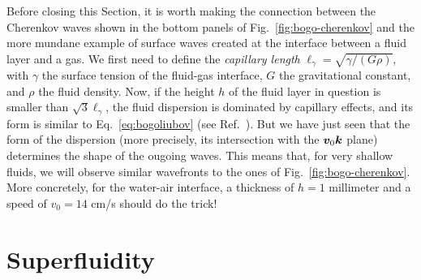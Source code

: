 Before closing this Section, it is worth making the connection between
the Cherenkov waves shown in the bottom panels of
Fig.~\ref{fig:bogo-cherenkov} and the more mundane example of surface
waves created at the interface between a fluid layer and a gas. We
first need to define the \textit{capillary length}
$\ell_{\gamma} = \sqrt{\gamma/(G\rho)}$, with $\gamma$ the surface
tension of the fluid-gas interface, $G$ the gravitational constant,
and $\rho$ the fluid density. Now, if the height $h$ of the fluid
layer in question is smaller than $\sqrt{3} \ell_{\gamma}$, the fluid
dispersion is dominated by capillary effects, and its form is similar
to Eq.~\eqref{eq:bogoliubov} (see Ref.~\cite{9783319002651}). But we
have just seen that the form of the dispersion (more precisely, its
intersection with the $\bm{v}_0\bm{k}$ plane) determines the shape of the
ougoing waves. This means that, for very shallow fluids, we will
observe similar wavefronts to the ones of
Fig.~\ref{fig:bogo-cherenkov}. More concretely, for the water-air
interface, a thickness of $h = 1$ millimeter and a speed of $v_0 = 14$
cm/s should do the trick!

\section{Superfluidity}
\label{sec:superfluid-atom}

